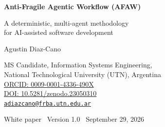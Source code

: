 \documentclass[11pt,a4paper]{article}
\begin{document}
\begin{center}
  {\sffamily\bfseries\huge Anti-Fragile Agentic Workflow (AFAW)\par}
  \vspace{0.5em}
  {\sffamily\Large A deterministic, multi-agent methodology\\ for AI-assisted software development\par}
  \vspace{1.2em}
  {\large Agustin Diaz-Cano\par}
  \vspace{0.3em}
  {\small MS Candidate, Information Systems Engineering,\\ National Technological University (UTN), Argentina\\[4pt]
  \href{https://orcid.org/0009-0001-4336-490X}{ORCID: 0009-0001-4336-490X}\\[2pt]
  \href{https://doi.org/10.5281/zenodo.23050310}{DOI: 10.5281/zenodo.23050310}\\[2pt]
  \href{mailto:adiazcano@frba.utn.edu.ar}{\texttt{adiazcano@frba.utn.edu.ar}}\par}
  \vspace{0.6em}
  {\small\sffamily White paper \textbullet\ Version 1.0 \textbullet\ September 29, 2026\par}
\end{center}
\end{document}
